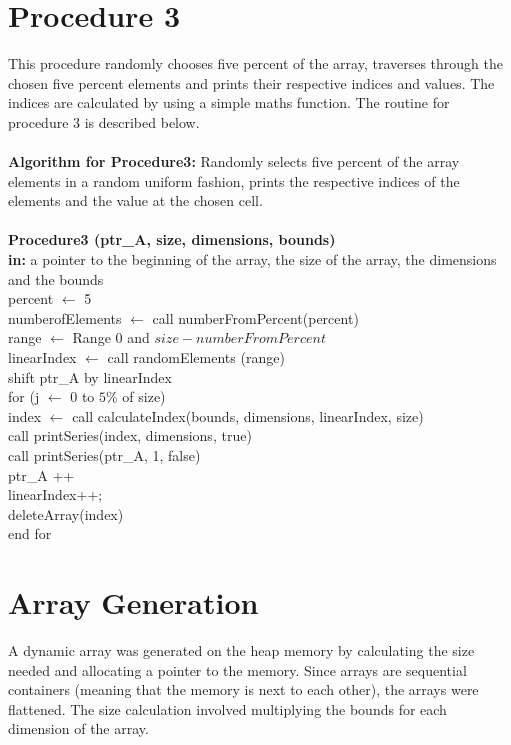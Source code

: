 \documentclass[10pt,a4paper]{article}
\begin{document}
\section{Procedure 3}
This procedure randomly chooses five percent of the array, traverses through the chosen five percent elements and prints their respective indices and values. The indices are calculated by using a simple maths function. The routine for procedure 3 is described below.\\ \\
\textbf{Algorithm for Procedure3:} Randomly selects five percent of the array elements in a random uniform fashion, prints the respective indices of the elements and the value at the chosen cell. \\ \\
\textbf{Procedure3 (ptr\_A, size, dimensions, bounds)}\\
\indent \textbf{in:} a pointer to the beginning of the array, the size of the array, the dimensions and the bounds \\
\indent percent $\leftarrow$ 5 \\
\indent numberofElements $\leftarrow$ call numberFromPercent(percent) \\
\indent range $\leftarrow$ Range $0$ and $size - numberFromPercent $\\ 
\indent linearIndex $\leftarrow$ call  randomElements (range) \\
\indent shift ptr\_A by linearIndex \\
\indent for (j $\leftarrow$ 0 to $5\%$ of size) \\
\indent\indent index $\leftarrow$ call calculateIndex(bounds, dimensions, linearIndex, size)\\
\indent\indent call printSeries(index, dimensions, true)\\
\indent\indent call printSeries(ptr\_A, 1, false)\\
\indent\indent ptr\_A ++ \\
\indent\indent linearIndex++;\\
\indent\indent deleteArray(index)\\
\indent end for\\
\section{Array Generation}
A dynamic array was generated on the heap memory by calculating the size needed and allocating a pointer to the memory. Since arrays are sequential containers (meaning that the memory is next to each other), the arrays were flattened. The size calculation involved multiplying the bounds for each dimension of the array. 
\end{document}
